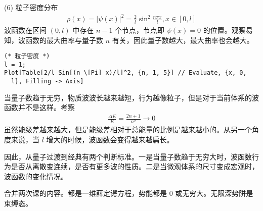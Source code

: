 (6) 粒子密度分布
\begin{eqnarray}
    \rho(x) = |\psi(x)|^2 = \frac 2l \sin^2 \frac{n\pi x}l, x\in[0,l]
\end{eqnarray}
波函数在区间 $(0,l)$ 中存在 $n-1$ 个节点，节点即 $\psi(x) = 0$ 的位置。观察易知，波函数的最大曲率与量子数 $n$ 有关，因此量子数越大，最大曲率也会越大。
\begin{lstlisting}
(* 粒子密度 *)
l = 1;
Plot[Table[2/l Sin[(n \[Pi] x)/l]^2, {n, 1, 5}] // Evaluate, {x, 0, 
  l}, Filling -> Axis]
\end{lstlisting}
当量子数趋于无穷，物质波波长越来越短，行为越像粒子，但是对于当前体系的波函数并不是这样。考察
\begin{eqnarray}
    \frac{\Delta E}{E} = \frac{2n+1}{n^2} \rightarrow 0
\end{eqnarray}
虽然能级差越来越大，但是能级差相对于总能量的比例是越来越小的。从另一个角度来说，当 $l$ 增大的时候，波函数会变得越来越扁长。

因此，从量子过渡到经典有两个判断标准。一是当量子数趋于无穷大时，波函数行为是否从离散变连续，是否有更多波的性质。二是当微观体系的尺寸变成宏观时，波函数的变化情况。


合并两次课的内容。都是一维薛定谔方程，势能都是 0 或无穷大。无限深势阱是束缚态。


